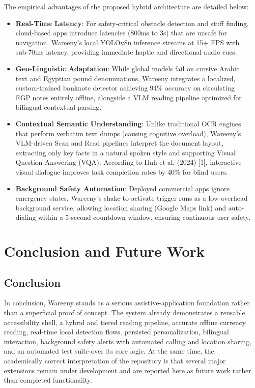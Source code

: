 \documentclass[12pt,a4paper]{report}
\begin{document}
The empirical advantages of the proposed hybrid architecture are detailed below:
\begin{itemize}
  \item \textbf{Real-Time Latency}: For safety-critical obstacle detection and stuff finding, cloud-based apps introduce latencies (800ms to 3s) that are unsafe for navigation. Wareeny’s local YOLOv8n inference streams at 15+ FPS with sub-70ms latency, providing immediate haptic and directional audio cues.
  \item \textbf{Geo-Linguistic Adaptation}: While global models fail on cursive Arabic text and Egyptian pound denominations, Wareeny integrates a localized, custom-trained banknote detector achieving 94\% accuracy on circulating EGP notes entirely offline, alongside a VLM reading pipeline optimized for bilingual contextual parsing.
  \item \textbf{Contextual Semantic Understanding}: Unlike traditional OCR engines that perform verbatim text dumps (causing cognitive overload), Wareeny's VLM-driven Scan and Read pipelines interpret the document layout, extracting only key facts in a natural spoken style and supporting Visual Question Answering (VQA). According to Huh et al. (2024) [1], interactive visual dialogue improves task completion rates by 40\% for blind users.
  \item \textbf{Background Safety Automation}: Deployed commercial apps ignore emergency states. Wareeny’s shake-to-activate trigger runs as a low-overhead background service, allowing location sharing (Google Maps link) and auto-dialing within a 5-second countdown window, ensuring continuous user safety.
\end{itemize}

\section{Conclusion and Future Work}
\subsection{Conclusion}
In conclusion, Wareeny stands as a serious assistive-application foundation rather than a superficial proof of concept. The system already demonstrates a reusable accessibility shell, a hybrid and tiered reading pipeline, accurate offline currency reading, real-time local detection flows, persisted personalization, bilingual interaction, background safety alerts with automated calling and location sharing, and an automated test suite over its core logic. At the same time, the academically correct interpretation of the repository is that several major extensions remain under development and are reported here as future work rather than completed functionality.
\end{document}
